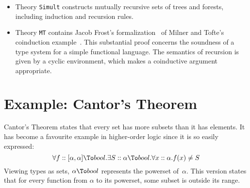\begin{itemize}
\item Theory {\tt Simult} constructs mutually recursive sets of trees and
  forests, including induction and recursion rules.

\item Theory {\tt MT} contains Jacob Frost's formalization~\cite{frost93} of
  Milner and Tofte's coinduction example~\cite{milner-coind}.  This
  substantial proof concerns the soundness of a type system for a simple
  functional language.  The semantics of recursion is given by a cyclic
  environment, which makes a coinductive argument appropriate.
\end{itemize}


\goodbreak
\section{Example: Cantor's Theorem}\label{sec:hol-cantor}
Cantor's Theorem states that every set has more subsets than it has
elements.  It has become a favourite example in higher-order logic since
it is so easily expressed:
\[  \forall f::[\alpha,\alpha]\To bool. \exists S::\alpha\To bool.
    \forall x::\alpha. f(x) \not= S 
\] 
%
Viewing types as sets, $\alpha\To bool$ represents the powerset
of~$\alpha$.  This version states that for every function from $\alpha$ to
its powerset, some subset is outside its range.  

